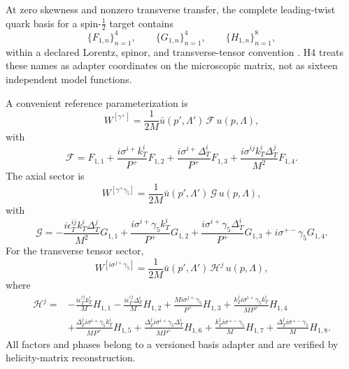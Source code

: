 \documentclass[11pt]{article}
\newcommand{\cG}{\mathcal G}
\newcommand{\cH}{\mathcal H}
\newcommand{\cF}{\mathcal F}
\begin{document}
At zero skewness and nonzero transverse transfer, the complete leading-twist
quark basis for a spin-\(\tfrac12\) target contains
\begin{equation}
 \{F_{1,n}\}_{n=1}^{4},\qquad
 \{G_{1,n}\}_{n=1}^{4},\qquad
 \{H_{1,n}\}_{n=1}^{8},
 \label{eq:quark-16-basis}
\end{equation}
within a declared Lorentz, spinor, and transverse-tensor convention
\cite{Meissner2009}.  H4 treats these names as adapter coordinates on the
microscopic matrix, not as sixteen independent model functions.

A convenient reference parameterization is
\begin{equation}
 W^{[\gamma^+]}
 =\frac{1}{2M}\bar u(p',\Lambda')\,\cF\,u(p,\Lambda),
\end{equation}
with
\begin{equation}
 \cF=
 F_{1,1}
 +\frac{i\sigma^{i+}k_T^i}{P^+}F_{1,2}
 +\frac{i\sigma^{i+}\Delta_T^i}{P^+}F_{1,3}
 +\frac{i\sigma^{ij}k_T^i\Delta_T^j}{M^2}F_{1,4}.
 \label{eq:h4-F-basis}
\end{equation}
The axial sector is
\begin{equation}
 W^{[\gamma^+\gamma_5]}
 =\frac{1}{2M}\bar u(p',\Lambda')\,\cG\,u(p,\Lambda),
\end{equation}
with
\begin{equation}
 \cG=
 -\frac{i\epsilon_T^{ij}k_T^i\Delta_T^j}{M^2}G_{1,1}
 +\frac{i\sigma^{i+}\gamma_5k_T^i}{P^+}G_{1,2}
 +\frac{i\sigma^{i+}\gamma_5\Delta_T^i}{P^+}G_{1,3}
 +i\sigma^{+-}\gamma_5G_{1,4}.
 \label{eq:h4-G-basis}
\end{equation}
For the transverse tensor sector,
\begin{equation}
 W^{[i\sigma^{j+}\gamma_5]}
 =\frac{1}{2M}\bar u(p',\Lambda')\,\cH^j\,u(p,\Lambda),
\end{equation}
where
\begin{align}
 \cH^j={}&
 -\frac{i\epsilon_T^{ij}k_T^i}{M}H_{1,1}
 -\frac{i\epsilon_T^{ij}\Delta_T^i}{M}H_{1,2}
 +\frac{Mi\sigma^{j+}\gamma_5}{P^+}H_{1,3}
 +\frac{k_T^ji\sigma^{i+}\gamma_5k_T^i}{MP^+}H_{1,4}
 \nonumber\\
 &+\frac{\Delta_T^ji\sigma^{i+}\gamma_5k_T^i}{MP^+}H_{1,5}
 +\frac{\Delta_T^ji\sigma^{i+}\gamma_5\Delta_T^i}{MP^+}H_{1,6}
 +\frac{k_T^ji\sigma^{+-}\gamma_5}{M}H_{1,7}
 +\frac{\Delta_T^ji\sigma^{+-}\gamma_5}{M}H_{1,8}.
 \label{eq:h4-H-basis}
\end{align}
All factors and phases belong to a versioned basis adapter and are verified by
helicity-matrix reconstruction.
\end{document}
